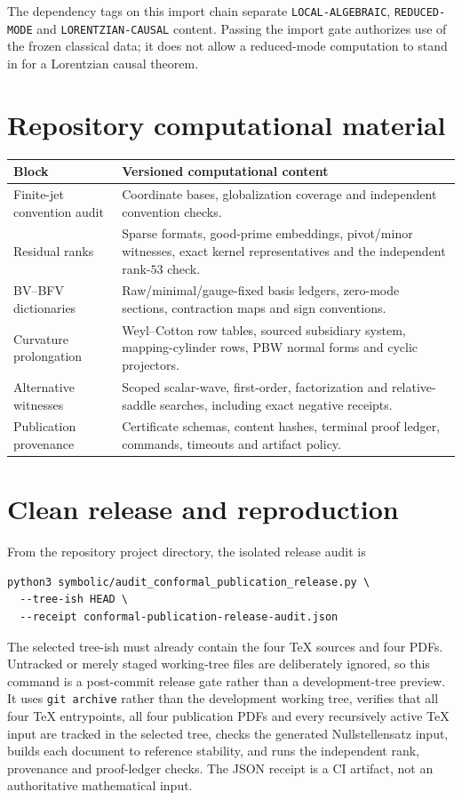 \documentclass[11pt]{article}
\begin{document}
The dependency tags on this import chain separate
\texttt{LOCAL-ALGEBRAIC}, \texttt{REDUCED-MODE} and
\texttt{LORENTZIAN-CAUSAL} content.  Passing the import gate authorizes use of
the frozen classical data; it does not allow a reduced-mode computation to
stand in for a Lorentzian causal theorem.

\section{Repository computational material}

\begin{longtable}{>{\raggedright\arraybackslash}p{}
                  >{\raggedright\arraybackslash}p{}}
\toprule
Block & Versioned computational content \\
\midrule
\endhead
Finite-jet convention audit & Coordinate bases, globalization coverage and
independent convention checks. \\
Residual ranks & Sparse formats, good-prime embeddings, pivot/minor witnesses,
exact kernel representatives and the independent rank-$53$ check. \\
BV--BFV dictionaries & Raw/minimal/gauge-fixed basis ledgers, zero-mode
sections, contraction maps and sign conventions. \\
Curvature prolongation & Weyl--Cotton row tables, sourced subsidiary system,
mapping-cylinder rows, PBW normal forms and cyclic projectors. \\
Alternative witnesses & Scoped scalar-wave, first-order, factorization and
relative-saddle searches, including exact negative receipts. \\
Publication provenance & Certificate schemas, content hashes, terminal proof
ledger, commands, timeouts and artifact policy. \\
\bottomrule
\end{longtable}

\section{Clean release and reproduction}

From the repository project directory, the isolated release audit is
\begin{verbatim}
python3 symbolic/audit_conformal_publication_release.py \
  --tree-ish HEAD \
  --receipt conformal-publication-release-audit.json
\end{verbatim}
The selected tree-ish must already contain the four TeX sources and four
PDFs.  Untracked or merely staged working-tree files are deliberately
ignored, so this command is a post-commit release gate rather than a
development-tree preview.
It uses \verb|git archive| rather than the development working tree, verifies
that all four TeX entrypoints, all four publication PDFs and every recursively
active TeX input are tracked in the selected tree, checks the generated
Nullstellensatz input, builds each document to reference stability, and runs the independent
rank, provenance and proof-ledger checks.  The JSON receipt is a CI artifact,
not an authoritative mathematical input.
\end{document}
